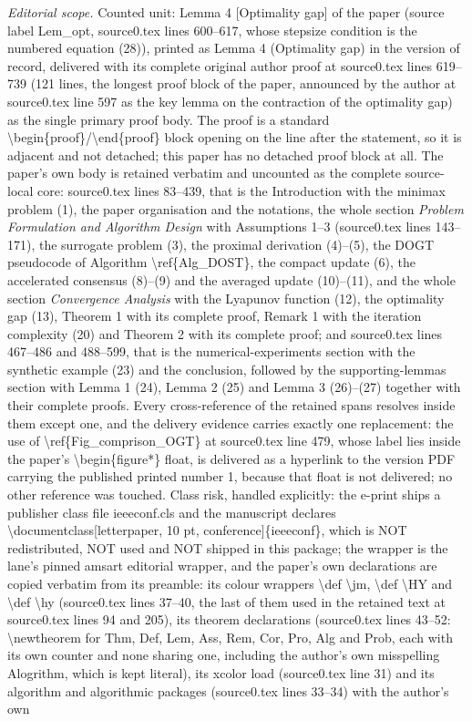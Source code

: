 \documentclass[10pt,a4paper]{amsart}
\begin{document}
\noindent\textit{Editorial scope.} Counted unit: Lemma 4 [Optimality gap] of the paper (source label Lem\_opt, source0.tex lines 600--617, whose stepsize condition is the numbered equation (28)), printed as Lemma 4 (Optimality gap) in the version of record, delivered with its complete original author proof at source0.tex lines 619--739 (121 lines, the longest proof block of the paper, announced by the author at source0.tex line 597 as the key lemma on the contraction of the optimality gap) as the single primary proof body. The proof is a standard \textbackslash{}begin\{proof\}/\textbackslash{}end\{proof\} block opening on the line after the statement, so it is adjacent and not detached; this paper has no detached proof block at all. The paper's own body is retained verbatim and uncounted as the complete source-local core: source0.tex lines 83--439, that is the Introduction with the minimax problem (1), the paper organisation and the notations, the whole section \emph{Problem Formulation and Algorithm Design} with Assumptions 1--3 (source0.tex lines 143--171), the surrogate problem (3), the proximal derivation (4)--(5), the DOGT pseudocode of Algorithm \textbackslash{}ref\{Alg\_DOST\}, the compact update (6), the accelerated consensus (8)--(9) and the averaged update (10)--(11), and the whole section \emph{Convergence Analysis} with the Lyapunov function (12), the optimality gap (13), Theorem 1 with its complete proof, Remark 1 with the iteration complexity (20) and Theorem 2 with its complete proof; and source0.tex lines 467--486 and 488--599, that is the numerical-experiments section with the synthetic example (23) and the conclusion, followed by the supporting-lemmas section with Lemma 1 (24), Lemma 2 (25) and Lemma 3 (26)--(27) together with their complete proofs. Every cross-reference of the retained spans resolves inside them except one, and the delivery evidence carries exactly one replacement: the use of \textbackslash{}ref\{Fig\_comprison\_OGT\} at source0.tex line 479, whose label lies inside the paper's \textbackslash{}begin\{figure*\} float, is delivered as a hyperlink to the version PDF carrying the published printed number 1, because that float is not delivered; no other reference was touched. Class risk, handled explicitly: the e-print ships a publisher class file ieeeconf.cls and the manuscript declares \textbackslash{}documentclass[letterpaper, 10 pt, conference]\{ieeeconf\}, which is NOT redistributed, NOT used and NOT shipped in this package; the wrapper is the lane's pinned amsart editorial wrapper, and the paper's own declarations are copied verbatim from its preamble: its colour wrappers \textbackslash{}def \textbackslash{}jm, \textbackslash{}def \textbackslash{}HY and \textbackslash{}def \textbackslash{}hy (source0.tex lines 37--40, the last of them used in the retained text at source0.tex lines 94 and 205), its theorem declarations (source0.tex lines 43--52: \textbackslash{}newtheorem for Thm, Def, Lem, Ass, Rem, Cor, Pro, Alg and Prob, each with its own counter and none sharing one, including the author's own misspelling Alogrithm, which is kept literal), its xcolor load (source0.tex line 31) and its algorithm and algorithmic packages (source0.tex lines 33--34) with the author's own 
\end{document}
